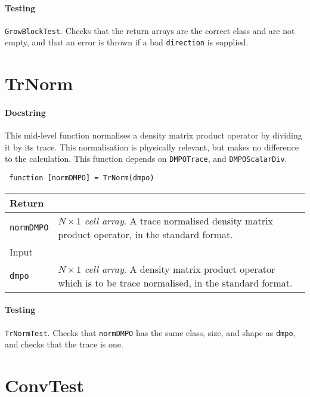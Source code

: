  \paragraph{Testing} \lstinline$GrowBlockTest$. Checks that the return arrays are the correct class and are not empty, and that an error is thrown if a bad \lstinline$direction$ is supplied.

 \section{TrNorm}
 \paragraph{Docstring} This mid-level function normalises a density matrix product operator by dividing it by its trace. This normalisation is physically relevant, but makes no difference to the calculation. This function depends on \lstinline$DMPOTrace$, and \lstinline$DMPOScalarDiv$.
 \begin{lstlisting}
 function [normDMPO] = TrNorm(dmpo) \end{lstlisting}
 \begin{longtabu}{X[1,l]X[4,l]}
 \hline
 Return & \\ \hline
 \lstinline$normDMPO$ & \emph{\(N \times 1\) cell array}. A trace normalised density matrix product operator, in the standard format. \\ \hline
 Input & \\ \hline
 \lstinline$dmpo$ & \emph{\(N \times 1\) cell array}. A density matrix product operator which is to be trace normalised, in the standard format. \\
 \hline
 \end{longtabu}
 \paragraph{Testing} \lstinline$TrNormTest$. Checks that \lstinline$normDMPO$ has the same class, size, and shape as \lstinline$dmpo$, and checks that the trace is one.

 \section{ConvTest}
